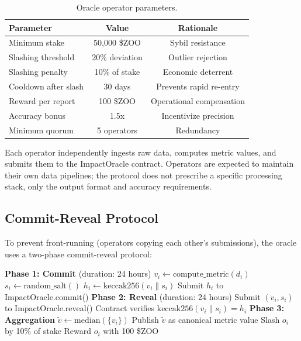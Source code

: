 \documentclass[11pt,letterpaper]{article}
\begin{document}
\begin{table}[t]
\centering
\begin{tabular}{lcc}
\toprule
\textbf{Parameter} & \textbf{Value} & \textbf{Rationale} \\
\midrule
Minimum stake & 50{,}000 \$ZOO & Sybil resistance \\
Slashing threshold & 20\% deviation & Outlier rejection \\
Slashing penalty & 10\% of stake & Economic deterrent \\
Cooldown after slash & 30 days & Prevents rapid re-entry \\
Reward per report & 100 \$ZOO & Operational compensation \\
Accuracy bonus & 1.5x & Incentivize precision \\
Minimum quorum & 5 operators & Redundancy \\
\bottomrule
\end{tabular}
\caption{Oracle operator parameters.}
\label{tab:operator}
\end{table}

Each operator independently ingests raw data, computes metric values, and submits them to the ImpactOracle contract. Operators are expected to maintain their own data pipelines; the protocol does not prescribe a specific processing stack, only the output format and accuracy requirements.

\subsection{Commit-Reveal Protocol}

To prevent front-running (operators copying each other's submissions), the oracle uses a two-phase commit-reveal protocol:

\begin{algorithm}[t]
\caption{Commit-Reveal Submission}
\label{alg:commitreveal}
\begin{algorithmic}[1]
\STATE \textbf{Phase 1: Commit} (duration: 24 hours)
    \STATE $v_i \leftarrow \text{compute\_metric}(d_i)$
    \STATE $s_i \leftarrow \text{random\_salt}()$
    \STATE $h_i \leftarrow \text{keccak256}(v_i \| s_i)$
    \STATE Submit $h_i$ to ImpactOracle.commit()
\ENDFOR
\STATE \textbf{Phase 2: Reveal} (duration: 24 hours)
    \STATE Submit $(v_i, s_i)$ to ImpactOracle.reveal()
    \STATE Contract verifies $\text{keccak256}(v_i \| s_i) = h_i$
\ENDFOR
\STATE \textbf{Phase 3: Aggregation}
\STATE $\tilde{v} \leftarrow \text{median}(\{v_i\})$
\STATE Publish $\tilde{v}$ as canonical metric value
        \STATE Slash $o_i$ by 10\% of stake
    \ELSE
        \STATE Reward $o_i$ with 100 \$ZOO
    \ENDIF
\ENDFOR
\end{algorithmic}
\end{algorithm}
\end{document}
